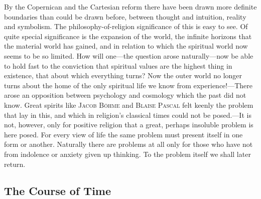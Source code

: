 \documentclass[12pt,a4paper]{book}
\begin{document}
By the Copernican and the Cartesian reform there have been drawn more definite
boundaries than could be drawn before, between thought and intuition, reality
and symbolism. The philosophy-of-religion significance of this is easy to see.
Of quite special significance is the expansion of the world, the infinite
horizons that the material world has gained, and in relation to which the
spiritual world now seems to be so limited. How will one---the question arose
naturally---now be able to hold fast to the conviction that spiritual values
are the highest thing in existence, that about which everything turns? Now the
outer world no longer turns about the home of the only spiritual life we know
from experience!---There arose an opposition between psychology and cosmology
which the past did not know. Great spirits like \textsc{Jacob Böhme} and
\textsc{Blaise Pascal} felt keenly the problem that lay in this, and which in
religion's classical times could not be posed.---It is not, however, only for
positive religion that a great, perhaps insoluble problem is here posed. For
every view of life the same problem must present itself in one form or
another. Naturally there are problems at all only for those who have not from
indolence or anxiety given up thinking. To the problem itself we shall later
return.

\subsection{The Course of Time}
\label{ssec:time}
\end{document}
